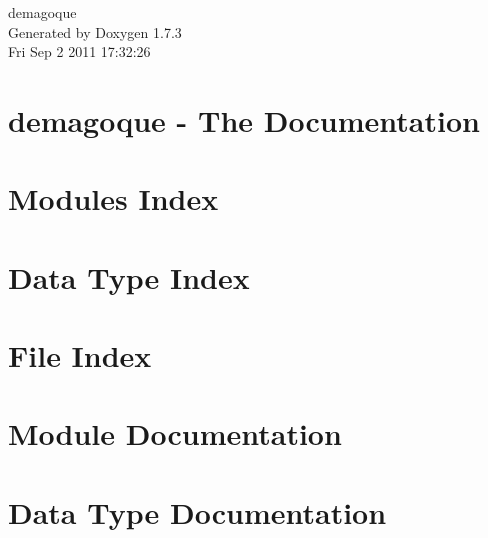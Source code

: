 \documentclass[a4paper]{book}
\begin{document}
\hypersetup{pageanchor=false}
\begin{titlepage}
\vspace*{7cm}
\begin{center}
{\Large demagoque }\\
\vspace*{1cm}
{\large Generated by Doxygen 1.7.3}\\
\vspace*{0.5cm}
{\small Fri Sep 2 2011 17:32:26}\\
\end{center}
\end{titlepage}
\clearemptydoublepage
{}
\tableofcontents
\clearemptydoublepage
{}
\hypersetup{pageanchor=true}
\chapter{demagoque -\/ The Documentation}
\label{index}\hypertarget{index}{}
\chapter{Modules Index}

\chapter{Data Type Index}

\chapter{File Index}

\chapter{Module Documentation}















\chapter{Data Type Documentation}

\end{document}

